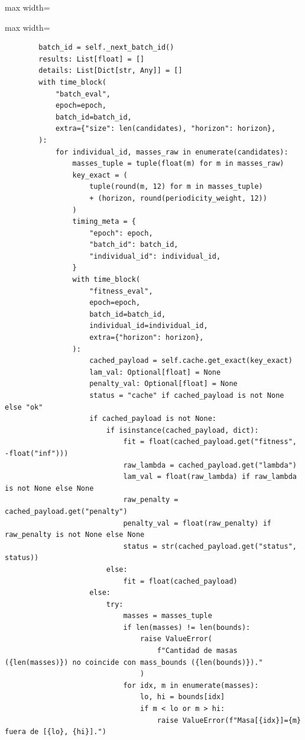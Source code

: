 \begin{listing}[H]
\begin{adjustbox}{max width=\textwidth}
\begin{minipage}{\linewidth}
{\begin{adjustbox}{max width=\textwidth}
\begin{minipage}{\textwidth}
\begin{verbatim}
        batch_id = self._next_batch_id()
        results: List[float] = []
        details: List[Dict[str, Any]] = []
        with time_block(
            "batch_eval",
            epoch=epoch,
            batch_id=batch_id,
            extra={"size": len(candidates), "horizon": horizon},
        ):
            for individual_id, masses_raw in enumerate(candidates):
                masses_tuple = tuple(float(m) for m in masses_raw)
                key_exact = (
                    tuple(round(m, 12) for m in masses_tuple)
                    + (horizon, round(periodicity_weight, 12))
                )
                timing_meta = {
                    "epoch": epoch,
                    "batch_id": batch_id,
                    "individual_id": individual_id,
                }
                with time_block(
                    "fitness_eval",
                    epoch=epoch,
                    batch_id=batch_id,
                    individual_id=individual_id,
                    extra={"horizon": horizon},
                ):
                    cached_payload = self.cache.get_exact(key_exact)
                    lam_val: Optional[float] = None
                    penalty_val: Optional[float] = None
                    status = "cache" if cached_payload is not None else "ok"
                    if cached_payload is not None:
                        if isinstance(cached_payload, dict):
                            fit = float(cached_payload.get("fitness", -float("inf")))
                            raw_lambda = cached_payload.get("lambda")
                            lam_val = float(raw_lambda) if raw_lambda is not None else None
                            raw_penalty = cached_payload.get("penalty")
                            penalty_val = float(raw_penalty) if raw_penalty is not None else None
                            status = str(cached_payload.get("status", status))
                        else:
                            fit = float(cached_payload)
                    else:
                        try:
                            masses = masses_tuple
                            if len(masses) != len(bounds):
                                raise ValueError(
                                    f"Cantidad de masas ({len(masses)}) no coincide con mass_bounds ({len(bounds)})."
                                )
                            for idx, m in enumerate(masses):
                                lo, hi = bounds[idx]
                                if m < lo or m > hi:
                                    raise ValueError(f"Masa[{idx}]={m} fuera de [{lo}, {hi}].")

\end{verbatim}
\end{minipage}
\end{adjustbox}}
\end{minipage}
\end{adjustbox}
\end{listing}
